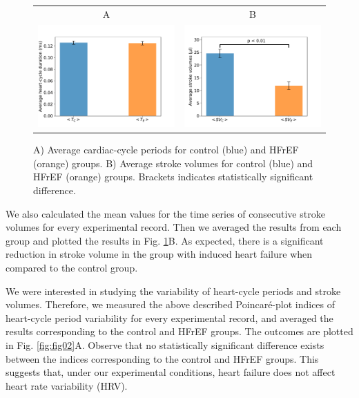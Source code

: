 \documentclass[%
preprint,
 amsmath,amssymb,
 aps,
]{revtex4-2}
\begin{document}
\begin{figure}[h!]
    \begin{tabular}{cc}
        A & B \\
        \includegraphics[width=3in]{Fig01_A.pdf} &
        \includegraphics[width=3in]{Fig01_B.pdf}
    \end{tabular}
    \caption{A) Average cardiac-cycle periods for control (blue) and HFrEF (orange) groups. B) Average stroke volumes for control (blue) and HFrEF (orange) groups. Brackets indicates statistically significant difference.}
    \label{fig:fig01}
\end{figure}

We also calculated the mean values for the time series of consecutive stroke volumes for every experimental record. Then we averaged the results from each group and plotted the results in Fig. \ref{fig:fig01}B. As expected, there is a significant reduction in stroke volume in the group with induced heart failure when compared to the control group.

We were interested in studying the variability of heart-cycle periods and stroke volumes. Therefore, we measured the above described Poincaré-plot indices of heart-cycle period variability for every experimental record, and averaged the results corresponding to the control and HFrEF groups. The outcomes are plotted in Fig. \ref{fig:fig02}A. Observe that no statistically significant difference exists between the indices corresponding to the control and HFrEF groups. This suggests that, under our experimental conditions, heart failure does not affect heart rate variability (HRV). 
\end{document}
